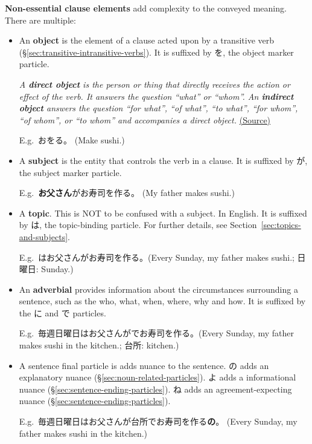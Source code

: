 \documentclass[../nihongo-gakushuu-kyouzai.tex]{subfiles}
\begin{document}
\textbf{Non-essential clause elements} add complexity to the conveyed meaning. There are multiple:
\begin{itemize}
    \item An \textbf{object} is the element of a clause acted upon by a transitive verb (\S\ref{sec:transitive-intransitive-verbs}). It is suffixed by を, the object marker particle.

    \emph{A \textbf{direct object} is the person or thing that directly receives the action or effect of the verb. It answers the question ``what'' or ``whom''.  An \textbf{indirect object} answers the question ``for what'', ``of what'', ``to what'', ``for whom'', ``of whom'', or ``to whom'' and accompanies a direct object.} \href{https://www.britannica.com/dictionary/eb/qa/Direct-and-Indirect-Objects}{(Source)}

    E.g.\ お\textbf{}をる。 (Make sushi.)
    \item A \textbf{subject} is the entity that controls the verb in a clause. It is suffixed by が, the subject marker particle.

    E.g.\ \textbf{お父さん}がお寿司を作る。 (My father makes sushi.)
    \item A \textbf{topic}. This is NOT to be confused with a subject. In English. It is suffixed by は, the topic-binding particle. For further details, see Section~\ref{sec:topics-and-subjects}.

    E.g.\ \textbf{}はお父さんがお寿司を作る。(Every Sunday, my father makes sushi.; 日曜日: Sunday.)
    \item An \textbf{adverbial} provides information about the circumstances surrounding a sentence, such as the who, what, when, where, why and how. It is suffixed by the に and で particles.

    E.g.\ 毎週日曜日はお父さんが\textbf{}でお寿司を作る。(Every Sunday, my father makes sushi in the kitchen.; 台所: kitchen.)

    \item A sentence final particle is adds nuance to the sentence. の adds an explanatory nuance (\S\ref{sec:noun-related-particles}). よ adds a informational nuance (\S\ref{sec:sentence-ending-particles}). ね adds an agreement-expecting nuance (\S\ref{sec:sentence-ending-particles}).

    E.g.\ 毎週日曜日はお父さんが台所でお寿司を作る\textbf{の}。 (Every Sunday, my father makes sushi in the kitchen.)
\end{itemize}
\end{document}
